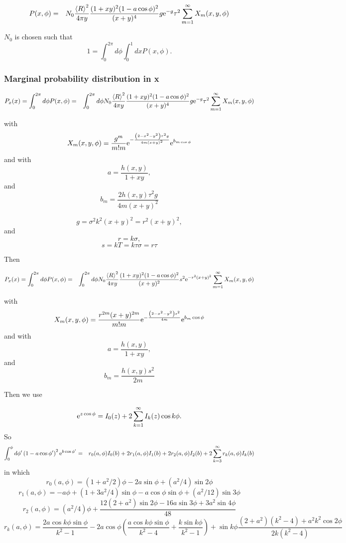 \documentclass[11pt,openany]{report}
\newcommand{\e}{{\rm e}}
\begin{document}
{{\begin{eqnarray}
 P(x,\phi)&=&
N_{0}\frac{\left<R\right>^{2}}{4\pi y}\frac{(1+xy)^{2}(1-a\cos\phi)^{2}}{(x+y)^{4}}g\e^{-g}\tau^{2}\sum_{m=1}^{\infty}X_{m}(x,y,\phi)
\end{eqnarray}

$N_{0}$ is chosen such that
$$1=\int_{0}^{2\pi}d\phi\int_{0}^{1}dxP(x,\phi).$$



\subsubsection{Marginal probability distribution in x}

\begin{eqnarray}
P_{x}(x)=\int_{0}^{2\pi}d\phi P(x,\phi)&=&
\int_{0}^{2\pi}d\phi N_{0}\frac{\left<R\right>^{2}}{4\pi y}\frac{(1+xy)^{2}(1-a\cos\phi)^{2}}{(x+y)^{4}}g\e^{-g}\tau^{2}\sum_{m=1}^{\infty}X_{m}(x,y,\phi)
\end{eqnarray}

with
$$X_{m}(x,y,\phi)=\frac{g^{m}}{m!m}\e^{-\frac{\left(2-x^{2}-y^{2}\right)\tau^{2}g}{4m(x+y)^{2}}}\e^{b_{m\cos\phi}}$$
and
with
$$a=\frac{h(x,y)}{1+xy},$$
and
$$b_{m}=\frac{2h(x,y)\tau^{2}g}{4m(x+y)^{2}}$$


$$g=\sigma^{2}k^{2}(x+y)^{2}=r^{2}(x+y)^{2},$$ and $$r=k\sigma,$$ $$s=kT=k\tau\sigma=r\tau$$


Then

\begin{eqnarray}
P_{x}(x)=\int_{0}^{2\pi}d\phi P(x,\phi)&=&
\int_{0}^{2\pi}d\phi N_{0}\frac{\left<R\right>^{2}}{4\pi y}\frac{(1+xy)^{2}(1-a\cos\phi)^{2}}{(x+y)^{2}}s^{2}\e^{-r^{2}(x+y)^{2}}\sum_{m=1}^{\infty}X_{m}(x,y,\phi)
\end{eqnarray}

with
$$X_{m}(x,y,\phi)=\frac{r^{2m}(x+y)^{2m}}{m!m}\e^{-\frac{\left(2-x^{2}-y^{2}\right)s^{2}}{4m}}\e^{b_{m}\cos\phi}$$
and
with
$$a=\frac{h(x,y)}{1+xy},$$
and
$$b_{m}=\frac{h(x,y)s^{2}}{2m}$$



Then we use

$$\e^{z\cos\phi}=I_{0}(z)+2\sum_{k=1}^{\infty}I_{k}(z)\cos k\phi.$$
So
\begin{eqnarray}
\int_{0}^{\phi}d\phi'\left(1-a\cos\phi' \right)^{2}\e^{b\cos\phi'}&=&
r_{0}(a,\phi)I_{0}(b)+2r_{1}(a,\phi)I_{1}(b)+2r_{2}(a,\phi)I_{2}(b)+2\sum_{k=3}^{\infty}r_{k}(a,\phi)I_{k}(b)
\end{eqnarray}
in which
$$r_{0}(a,\phi)=(1+a^{2}/2)\phi-2a\sin\phi+(a^{2}/4)\sin2\phi$$
$$r_{1}(a,\phi)=-a\phi+(1+3a^{2}/4)\sin\phi-a\cos\phi\sin\phi+(a^{2}/12)\sin3\phi$$
$$r_{2}(a,\phi)=(a^{2}/4)\phi+\frac{12(2+a^{2})\sin2\phi-16a\sin3\phi+3a^{2}\sin4\phi}{48}$$
$$r_{k}(a,\phi)=\frac{2a\cos k\phi\sin\phi}{k^{2}-1}-2a\cos\phi\left(\frac{a\cos k\phi\sin\phi}{k^{2}-4}+\frac{k\sin k\phi}{k^{2}-1}\right)+\sin k\phi\frac{(2+a^{2})(k^{2}-4)+a^{2}k^{2}\cos2\phi}{2k(k^{2}-4)}$$

}}
\end{document}
